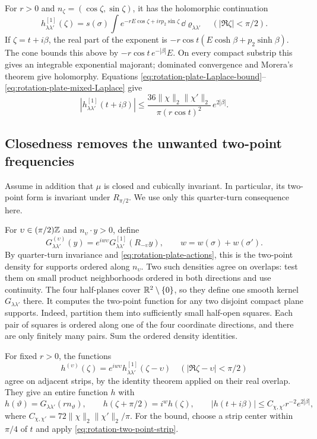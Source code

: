 For $r>0$ and $n_\zeta=(\cos\zeta,\sin\zeta)$, it has the
holomorphic continuation
\[
 h^{[1]}_{\lambda\lambda'}(\zeta)
   =s(\sigma)\int
       e^{-rE\cos\zeta+irp_2\sin\zeta}\,
                                \dd\varrho_{\lambda\lambda'}
       \quad(|\Re\zeta|<\pi/2).
\]
If $\zeta=t+i\beta$, the real part of the exponent is
$-r\cos t(E\cosh\beta+p_2\sinh\beta)$.
The cone bounds this above by
$-r\cos t\,e^{-|\beta|}E$.
On every compact substrip this gives an integrable exponential
majorant; dominated convergence and Morera's theorem give
holomorphy. Equations
\eqref{eq:rotation-plate-Laplace-bound}--\eqref{eq:rotation-plate-mixed-Laplace}
give
\begin{equation}\label{eq:rotation-two-point-strip}
 |h^{[1]}_{\lambda\lambda'}(t+i\beta)|
 \le\frac{36\|\chi\|_2\|\chi'\|_2}
          {\pi(r\cos t)^2}\,e^{2|\beta|}.
\end{equation}

\subsection{Closedness removes the unwanted two-point frequencies}
\label{subsec:rotation-two-point-frequencies}

Assume in addition that $\mu$ is closed and cubically invariant.
In particular, its two-point form is invariant under
$R_{\pi/2}$. We use only this quarter-turn consequence here.

For $\upsilon\in(\pi/2)\mathbb Z$ and $n_\upsilon\cdot y>0$, define
\[
 G^{(\upsilon)}_{\lambda\lambda'}(y)
   =e^{iw\upsilon}
       G^{[1]}_{\lambda\lambda'}(R_{-\upsilon}y),
       \qquad w=w(\sigma)+w(\sigma').
\]
By quarter-turn invariance and
\eqref{eq:rotation-plate-actions}, this is the two-point density
for supports ordered along $n_\upsilon$.
Two such densities agree on overlaps: test them on small product
neighborhoods ordered in both directions and use continuity.
The four half-planes cover $\mathbb R^2\setminus\{0\}$, so they define
one smooth kernel $G_{\lambda\lambda'}$ there.
It computes the two-point function for any two disjoint compact
plane supports. Indeed, partition them into sufficiently small
half-open squares. Each pair of squares is ordered along one of
the four coordinate directions, and there are only finitely many
pairs. Sum the ordered density identities.

For fixed $r>0$, the functions
\[
 h^{(\upsilon)}(\zeta)=e^{iw\upsilon}
       h^{[1]}_{\lambda\lambda'}(\zeta-\upsilon)
       \quad(|\Re\zeta-\upsilon|<\pi/2)
\]
agree on adjacent strips, by the identity theorem applied on
their real overlap. They give an entire function $h$ with
\begin{equation}\label{eq:rotation-two-point-entire-angle}
 h(\vartheta)=G_{\lambda\lambda'}(rn_\vartheta),\qquad
 h(\zeta+\pi/2)=i^w h(\zeta),\qquad
 |h(t+i\beta)|\le C_{\chi,\chi'}r^{-2}e^{2|\beta|},
\end{equation}
where $C_{\chi,\chi'}=72\|\chi\|_2\|\chi'\|_2/\pi$.
For the bound, choose a strip center within $\pi/4$ of $t$ and
apply \eqref{eq:rotation-two-point-strip}.

